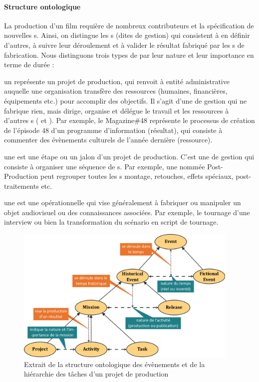 \paragraph{Structure ontologique} 
La production d'un film requière de nombreux contributeurs et la spécification de nouvelles s.
Ainsi, on distingue les s (dites de gestion) qui consistent à en définir d'autres, à suivre leur déroulement et à valider le résultat fabriqué par les s de fabrication. 
Nous distinguons trois types de  par leur nature et leur importance en terme de durée : 
\begin{liste}
	\item un  représente un projet de production, qui renvoit à entité administrative auquelle une organisation transfère des ressources (humaines, financières, équipements etc.) pour accomplir des objectifs. 
	Il s'agit d'une  de gestion qui ne fabrique rien, mais dirige, organise et délégue le travail et les ressources à d'autres s ( et ).
	Par exemple, le  Magazine\#48 représente le processus de création de l'épisode 48 d'un programme d'information (résultat), qui consiste à commenter des évènements culturels de l'année dernière (ressource).

	\item une  est une étape ou un jalon d'un projet de production. 
	C'est une  de gestion qui consiste à organiser une séquence de s.
	Par exemple, une  nommée Post-Production peut regrouper toutes les s montage, retouches, effets spéciaux, post-traitements etc.

	\item une  est une  opérationnelle qui vise généralement à fabriquer ou manipuler un objet audiovisuel ou des connaissances associées.
	Par exemple, le tournage d'une interview ou bien la transformation du scénario en script de tournage. 
\end{liste}

\begin{figure}[ht!]
\centering
\includegraphics[width=0.95\textwidth]{./images/SO-Event-v1.png}
\caption{Extrait de la structure ontologique des évènements et de la hiérarchie des tâches d'un projet de production}
\label{img:so-event}
\end{figure}


